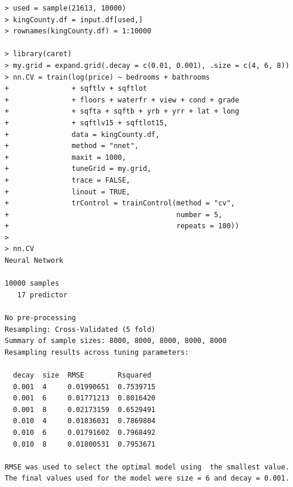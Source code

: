 \documentclass{article}%
\begin{document}
\begin{verbatim}
> used = sample(21613, 10000)
> kingCounty.df = input.df[used,]
> rownames(kingCounty.df) = 1:10000

> library(caret)
> my.grid = expand.grid(.decay = c(0.01, 0.001), .size = c(4, 6, 8))
> nn.CV = train(log(price) ~ bedrooms + bathrooms
+               + sqftlv + sqftlot
+               + floors + waterfr + view + cond + grade 
+               + sqfta + sqftb + yrb + yrr + lat + long
+               + sqftlv15 + sqftlot15, 
+               data = kingCounty.df, 
+               method = "nnet", 
+               maxit = 1000,
+               tuneGrid = my.grid,
+               trace = FALSE,
+               linout = TRUE,
+               trControl = trainControl(method = "cv",
+                                        number = 5,
+                                        repeats = 100))
> 
> nn.CV
Neural Network 

10000 samples
   17 predictor

No pre-processing
Resampling: Cross-Validated (5 fold) 
Summary of sample sizes: 8000, 8000, 8000, 8000, 8000 
Resampling results across tuning parameters:

  decay  size  RMSE        Rsquared 
  0.001  4     0.01990651  0.7539715
  0.001  6     0.01771213  0.8016420
  0.001  8     0.02173159  0.6529491
  0.010  4     0.01836031  0.7869804
  0.010  6     0.01791602  0.7968492
  0.010  8     0.01800531  0.7953671

RMSE was used to select the optimal model using  the smallest value.
The final values used for the model were size = 6 and decay = 0.001.
\end{verbatim}
\end{document}
